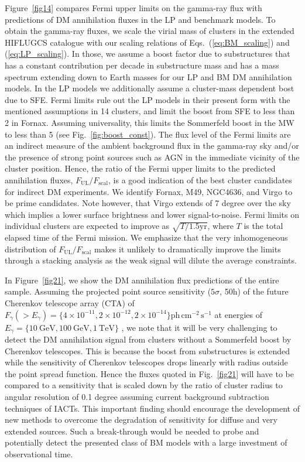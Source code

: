 \documentclass[10pt,aps,pra,reprint,amsmath,amsfonts,amssymb,showpacs,nofootinbib,floatfix]{revtex4-1}
\newcommand{\rmn}{\mathrm}
\begin{document}
Figure~\ref{fig14} compares Fermi upper limits on the gamma-ray flux
with predictions of DM annihilation fluxes in the LP and benchmark
models.  To obtain the gamma-ray fluxes, we scale the virial mass of
clusters in the extended HIFLUGCS catalogue \cite{2002ApJ...567..716R}
with our scaling relations of Eqs.~(\ref{eq:BM_scaling}) and
(\ref{eq:LP_scaling}). In those, we assume a boost factor due to
substructures that has a constant contribution per decade in
substructure mass and has a mass spectrum extending down to Earth
masses for our LP and BM DM annihilation models. In the LP models we
additionally assume a cluster-mass dependent bost due to SFE. Fermi
limits rule out the LP models in their present form with the mentioned
assumptions in 14 clusters, and limit the boost from SFE to less than
2 in Fornax. Assuming universality, this limits the Sommerfeld boost
in the MW to less than 5 (see Fig.~\ref{fig:boost_const}).  The flux
level of the Fermi limits are an indirect measure of the ambient
background flux in the gamma-ray sky and/or the presence of strong
point sources such as AGN in the immediate vicinity of the cluster
position. Hence, the ratio of the Fermi upper limits to the predicted
annihilation fluxes, $F_{\mathrm{UL}}/F_{\mathrm{scal}}$, is a good
indication of the best cluster candidates for indirect DM
experiments. We identify Fornax, M49, NGC4636, and Virgo to be prime
candidates. Note however, that Virgo extends of 7 degree over the sky
which implies a lower surface brightness and lower signal-to-noise.
Fermi limits on individual clusters are expected to improve as
$\sqrt{T/1.5 \mathrm{yr}}$, where $T$ is the total elapsed time of the
Fermi mission. We emphasize that the very inhomogeneous distribution
of $F_{\mathrm{UL}}/ F_{\mathrm{scal}}$ makes it unlikely to
dramatically improve the limits through a stacking analysis as the
weak signal will dilute the average constraints.

In Figure~\ref{fig21}, we show the DM annihilation flux predictions of
the entire sample.  Assuming the projected point source sensitivity
($5\sigma$, 50h) of the future Cherenkov telescope array (CTA) of
$F_\gamma(>E_\gamma) = \{4\times10^{-11}, 2\times10^{-12},
2\times10^{-14}\} \rmn{ph}\,\rmn{cm}^{-2}\,\rmn{s}^{-1}$ at energies
of $E_\gamma=\{10~\rmn{GeV}, 100~\rmn{GeV}, 1~\rmn{TeV}\}$
\cite{2009arXiv0908.1410D}, we note that it will be very challenging
to detect the DM annihilation signal from clusters without a
Sommerfeld boost by Cherenkov telescopes.  This is because the boost
from substructures is extended while the sensitivity of Cherenkov
telescopes drops linearly with radius outside the point spread
function. Hence the fluxes quoted in Fig.~\ref{fig21} will have to be
compared to a sensitivity that is scaled down by the ratio of cluster
radius to angular resolution of 0.1 degree assuming current background
subtraction techniques of IACTs.  This important finding should
encourage the development of new methods to overcome the degradation
of sensitivity for diffuse and very extended sources. Such a
break-through would be needed to probe and potentially detect the
presented class of BM models with a large investment of observational
time.
\end{document}
